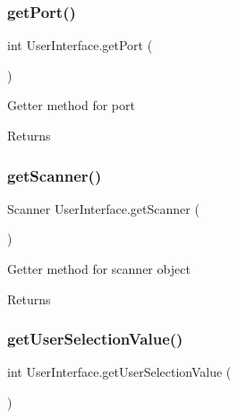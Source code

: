 \subsubsection{\texorpdfstring{get\+Port()}{getPort()}}
{\footnotesize\ttfamily int User\+Interface.\+get\+Port (\begin{DoxyParamCaption}{ }\end{DoxyParamCaption})\hspace{0.3cm}{\ttfamily [inline]}}

Getter method for port \begin{DoxyReturn}{Returns}

\end{DoxyReturn}
\mbox{\label{class_user_interface_a73a95f25426d17a82f506bfa546ffc21}} 
\subsubsection{\texorpdfstring{get\+Scanner()}{getScanner()}}
{\footnotesize\ttfamily Scanner User\+Interface.\+get\+Scanner (\begin{DoxyParamCaption}{ }\end{DoxyParamCaption})\hspace{0.3cm}{\ttfamily [inline]}}

Getter method for scanner object \begin{DoxyReturn}{Returns}

\end{DoxyReturn}
\mbox{\label{class_user_interface_ad83d86cf79d6766eaf8acbc4453c9abe}} 
\subsubsection{\texorpdfstring{get\+User\+Selection\+Value()}{getUserSelectionValue()}}
{\footnotesize\ttfamily int User\+Interface.\+get\+User\+Selection\+Value (\begin{DoxyParamCaption}{ }\end{DoxyParamCaption})\hspace{0.3cm}{\ttfamily [inline]}}

